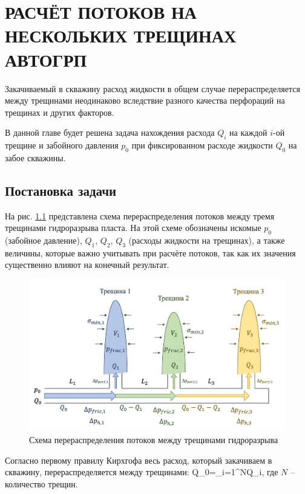 \chapter{РАСЧЁТ ПОТОКОВ НА НЕСКОЛЬКИХ ТРЕЩИНАХ АВТОГРП} \label{ch3}

Закачиваемый в скважину расход жидкости в общем случае перераспределяется между трещинами неодинаково вследствие разного качества перфораций на трещинах и других факторов.

В данной главе будет решена задача нахождения расхода $Q_i$ на каждой $i$-ой трещине и забойного давления $p_0$ при фиксированном расходе жидкости $Q_0$ на забое скважины.

\section{Постановка задачи}
\vspace*{-5mm}

На рис. \ref{fig:flow_distribution_scheme} представлена схема перераспределения потоков между тремя трещинами гидроразрыва пласта.
На этой схеме обозначены искомые $p_0$ (забойное давление), $Q_1$, $Q_2$, $Q_3$ (расходы жидкости на трещинах), а также величины, которые важно учитывать при расчёте потоков, так как их значения существенно влияют на конечный результат.

\begin{figure}[H] 
\center
\includegraphics[width=\linewidth]{images/flow_distribution_scheme.jpg}
\caption{Схема перераспределения потоков между трещинами гидроразрыва} 
\label{fig:flow_distribution_scheme}  
\end{figure}

Согласно первому правилу Кирхгофа весь расход, который закачиваем в скважину, перераспределяется между трещинами:
\beq\label{3_1}
Q_0=\sum\limits_{i=1}^{N}Q_i,
\eeq
где $N$ -- количество трещин.

